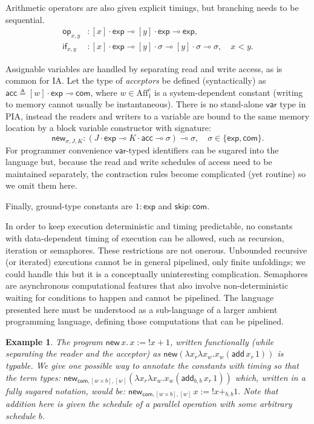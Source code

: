 \documentclass{article}
\newcommand{\defeq}{\triangleq}
\newcommand{\aff}{\mathrm{Aff}_1^c}
\newcommand{\lexpt}{\mathsf{exp}}
\newcommand{\lvart}{\mathsf{var}}
\newcommand{\lcomt}{\mathsf{com}}
\newcommand{\lacct}{\mathsf{acc}}
\newcommand{\lopc}{\mathsf{op}}
\newcommand{\lifc}{\mathsf{if}}
\newcommand{\lnewc}{\mathsf{new}}
\newcommand{\lskipc}{\mathsf{skip}}
\newtheorem{example}[theorem]{Example}
\begin{document}
Arithmetic operators are also given explicit timings, but branching needs to be sequential.
\begin{align*}
\lopc_{x,y}&:[x]\cdot\lexpt\multimap [y]\cdot\lexpt\multimap\lexpt,\\
\lifc_{x,y} &: [x]\cdot\lexpt\multimap [y]\cdot\sigma\multimap [y]\cdot\sigma\multimap\sigma,
	\quad   x<  y.
\end{align*}

Assignable variables are handled by separating read and write access, as is common for IA. Let the type of \emph{acceptors} be defined (syntactically) as $\lacct\defeq[w]\cdot\lexpt\multimap\lcomt$, where $w\in\aff$ is a system-dependent constant (writing to memory cannot usually be instantaneous). There is no stand-alone $\lvart$ type in PIA, instead the readers and writers to a variable are bound to the same memory location by a block variable constructor with signature:
\[
\lnewc_{\sigma,J,K}:(J\cdot\lexpt\multimap K\cdot\lacct\multimap \sigma)\multimap \sigma, \quad \sigma\in\{\lexpt, \lcomt\}.
\]
For programmer convenience $\lvart$-typed identifiers can be sugared into the language but, because the read and write schedules of access need to be maintained separately, the contraction rules become complicated (yet routine) so we omit them here. 

Finally, ground-type constants are 
$
1:\lexpt$ and $\lskipc:\lcomt.
$

In order to keep execution deterministic and timing predictable, no constants with data-dependent timing of execution can be allowed, such as recursion, iteration or semaphores. These restrictions are not onerous. Unbounded recursive (or iterated) executions cannot be in general pipelined, only finite unfoldings; we could handle this but it is a conceptually uninteresting complication. Semaphores are asynchronous computational features that also involve non-deterministic waiting for conditions to happen and cannot be pipelined. The language presented here must be understood as a sub-language of a larger ambient programming language, defining those computations that can be pipelined. 

\begin{example} \label{ex:incx}
The program $\lnewc\,x.\,x:={!}x+1$, written functionally (while separating the reader and the acceptor) as $\lnewc(\lambda x_r\lambda x_w.x_w(\mathsf{add}\,x_r\,1))$ is typable. We give one possible way to annotate the constants with timing so that the term types:
$
\lnewc_{\lcomt,[w\times b],[w]}(\lambda x_r\lambda x_w.x_w(\mathsf{add}_{b,b}\,x_r\,1))
$
which, written in a fully sugared notation, would be:
$
\lnewc_{\lcomt,[w\times b],[w]}\,x:={!}x+_{b,b}1.
$
Note that addition here is given the schedule of a parallel operation with some arbitrary schedule $b$.
\end{example}
\end{document}
